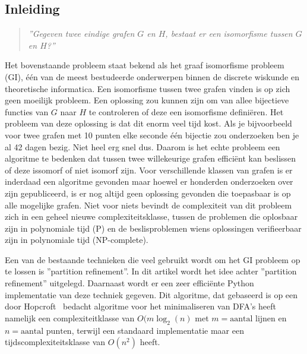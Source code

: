\documentclass[twoside]{article}
\begin{document}
\begin{multicols}{2} %



\section*{Inleiding}
\begin{quote}
\textit{''Gegeven twee eindige grafen $G$ en $H$, bestaat er een isomorfisme tussen $G$ en $H$?''}
\end{quote}

Het bovenstaande probleem staat bekend als het graaf isomorfisme probleem  (GI), één van de meest bestudeerde onderwerpen binnen de discrete wiskunde en theoretische informatica. Een isomorfisme tussen twee grafen vinden is op zich geen moeilijk probleem. Een oplossing zou kunnen zijn om van allee bijectieve functies van $G$ naar $H$ te controleren of deze een isomorfisme defini\"eren. Het probleem van deze oplossing is dat dit enorm veel tijd kost. Als je bijvoorbeeld voor twee grafen met 10 punten elke seconde \'e\'en bijectie zou onderzoeken ben je al 42 dagen bezig. Niet heel erg snel dus. Daarom is het echte probleem een algoritme te bedenken dat tussen twee willekeurige grafen effici\"ent kan beslissen of deze issomorf of niet isomorf zijn. Voor verschillende klassen van grafen is er inderdaad een algoritme gevonden maar hoewel er honderden onderzoeken over zijn gepubliceerd, is er nog altijd geen oplossing gevonden die toepasbaar is op alle mogelijke grafen. Niet voor niets bevindt de complexiteit van dit probleem zich in een geheel nieuwe complexiteitsklasse, tussen de problemen die oplosbaar zijn in polynomiale tijd (P) en de beslisproblemen wiens oplossingen verifieerbaar zijn in polynomiale tijd (NP-complete).

Een van de bestaande technieken die veel gebruikt wordt om het GI probleem op te lossen is ''partition refinement''. In dit artikel wordt het idee achter ''partition refinement'' uitgelegd. Daarnaast wordt er een zeer effici\"ente Python implementatie van deze techniek gegeven. Dit algoritme, dat gebaseerd is op een door Hopcroft~\cite{MR0403320} bedacht algoritme voor het minimaliseren van DFA's heeft namelijk een complexiteitklasse van $O(m \log_{2} (n)$ met $m= \text{aantal lijnen}$ en $n = \text{aantal punten}$, terwijl een standaard implementatie maar een tijdscomplexiteitsklasse van $O(n^2)$ heeft.


\end{multicols}
\end{document}
